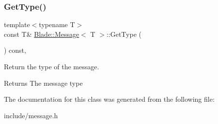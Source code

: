 \subsubsection{\texorpdfstring{Get\+Type()}{GetType()}}
{\footnotesize\ttfamily template$<$typename T$>$ \\
const T\& \hyperlink{class_blade_1_1_message}{Blade\+::\+Message}$<$ T $>$\+::Get\+Type (\begin{DoxyParamCaption}{ }\end{DoxyParamCaption}) const\hspace{0.3cm}{\ttfamily [inline]}, {\ttfamily [noexcept]}}



Return the type of the message. 

\begin{DoxyReturn}{Returns}
The message type 
\end{DoxyReturn}


The documentation for this class was generated from the following file\+:\begin{DoxyCompactItemize}
\item 
include/message.\+h\end{DoxyCompactItemize}
